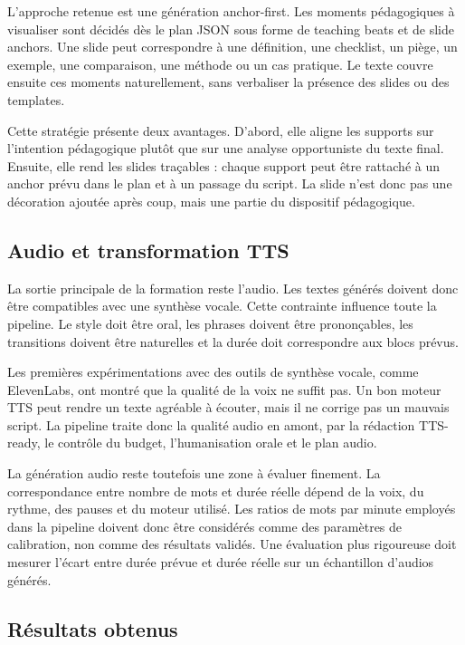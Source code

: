 \documentclass[12pt,a4paper]{article}
\begin{document}
L'approche retenue est une génération anchor-first. Les moments pédagogiques à
visualiser sont décidés dès le plan JSON sous forme de teaching beats et de slide anchors.
Une slide peut correspondre à une définition, une checklist, un piège, un exemple, une
comparaison, une méthode ou un cas pratique. Le texte couvre ensuite ces moments
naturellement, sans verbaliser la présence des slides ou des templates.

Cette stratégie présente deux avantages. D'abord, elle aligne les supports sur l'intention
pédagogique plutôt que sur une analyse opportuniste du texte final. Ensuite, elle rend les
slides traçables : chaque support peut être rattaché à un anchor prévu dans le plan et à
un passage du script. La slide n'est donc pas une décoration ajoutée après coup, mais une
partie du dispositif pédagogique.

\subsection{Audio et transformation TTS}

La sortie principale de la formation reste l'audio. Les textes générés doivent donc être
compatibles avec une synthèse vocale. Cette contrainte influence toute la pipeline. Le
style doit être oral, les phrases doivent être prononçables, les transitions doivent être
naturelles et la durée doit correspondre aux blocs prévus.

Les premières expérimentations avec des outils de synthèse vocale, comme ElevenLabs,
ont montré que la qualité de la voix ne suffit pas. Un bon moteur TTS peut rendre un
texte agréable à écouter, mais il ne corrige pas un mauvais script. La pipeline traite donc
la qualité audio en amont, par la rédaction TTS-ready, le contrôle du budget, l'humanisation
orale et le plan audio.

La génération audio reste toutefois une zone à évaluer finement. La correspondance entre
nombre de mots et durée réelle dépend de la voix, du rythme, des pauses et du moteur
utilisé. Les ratios de mots par minute employés dans la pipeline doivent donc être
considérés comme des paramètres de calibration, non comme des résultats validés. Une
évaluation plus rigoureuse doit mesurer l'écart entre durée prévue et durée réelle sur un
échantillon d'audios générés.

\subsection{Résultats obtenus}
\end{document}
